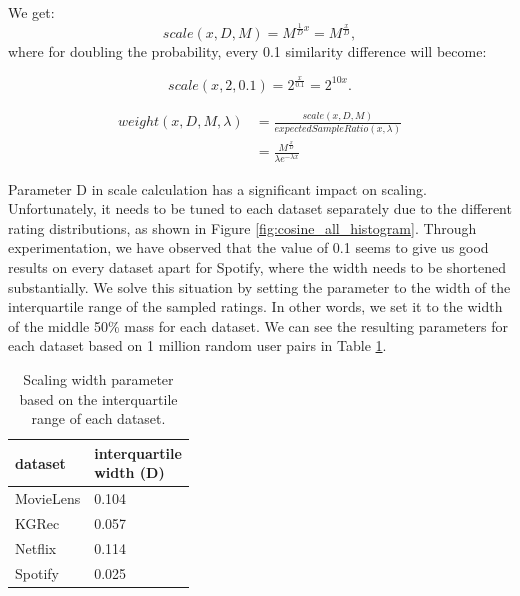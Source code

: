 We get:
\begin{equation}
    scale(x, D, M) = M^{\frac{1}{D}x} = M^{\frac{x}{D}},
\end{equation}
where for doubling the probability, every 0.1 similarity difference will become:

\begin{equation}
    scale(x, 2, 0.1) = 2^{\frac{x}{0.1}} = 2^{10x}.
\end{equation}


\begin{equation}\label{eq:weight}
    \begin{aligned}
        weight(x, D, M, \lambda) &= \frac{scale(x, D, M)}{expectedSampleRatio(x, \lambda)} \\
        & = \frac{M^{\frac{x}{D}}}{\lambda e ^{-\lambda x}}
    \end{aligned}
\end{equation}

Parameter D in scale calculation has a significant impact on scaling. Unfortunately, it needs to be tuned to each dataset separately due to the different rating distributions, as shown in Figure \ref{fig:cosine_all_histogram}. Through experimentation, we have observed that the value of 0.1 seems to give us good results on every dataset apart for Spotify, where the width needs to be shortened substantially. We solve this situation by setting the parameter to the width of the interquartile range of the sampled ratings. In other words, we set it to the width of the middle 50\% mass for each dataset. We can see the resulting parameters for each dataset based on 1 million random user pairs in Table \ref{table:5.3_interquartile_width}. 

\begin{table}[!ht]
    \centering
    \begin{tabular}{ l l}
        dataset & \makecell[l]{interquartile \\ width (D)} \\
        \hline
        MovieLens & 0.104 \\
        KGRec & 0.057 \\
        Netflix & 0.114 \\
        Spotify & 0.025
            
    \end{tabular}
    \caption{Scaling width parameter based on the interquartile range of each dataset.}
    \label{table:5.3_interquartile_width}
\end{table}



